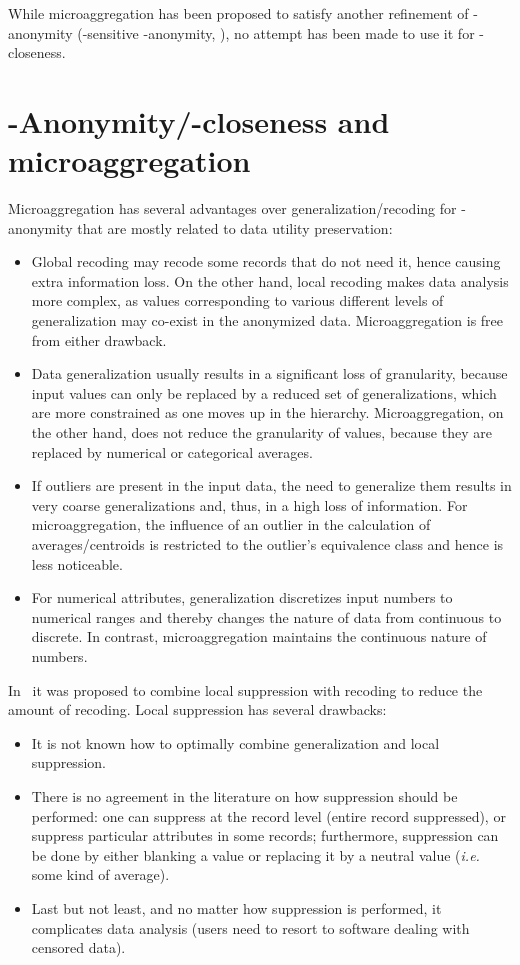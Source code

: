 \documentclass[10pt,journal,compsoc]{IEEEtran}
\theoremstyle{definition}
\theoremstyle{plain}
\begin{document}
While microaggregation has been proposed to satisfy
another refinement of -anonymity 
(-sensitive -anonymity, \cite{Solanas2008microaggregation}),
no attempt has been made to use it for -closeness.

\section{-Anonymity/-closeness and microaggregation}
\label{sec:comparison}





Microaggregation has several 
advantages over generalization/recoding for -anonymity that are 
mostly related to data utility preservation:
\begin{itemize}
\item Global recoding may recode some records that
do not need it, hence causing extra information loss.
On the other hand, local recoding makes data analysis more
complex, as values corresponding to various different
levels of generalization may co-exist in the anonymized data.
Microaggregation is free from either drawback.
\item Data generalization usually results in a significant 
loss of granularity, because input values can only be replaced 
by a reduced set of generalizations, which 
are more constrained as one moves up in the hierarchy. 
Microaggregation, on the other hand,
does not reduce the granularity of values, because they are 
replaced by numerical or categorical averages.
\item If outliers are present in the input data, 
the need to generalize them
results in very coarse generalizations and, thus, in a high loss of information.
For microaggregation, the influence of an outlier in the 
calculation of averages/centroids
is restricted to the outlier's equivalence class and hence is less noticeable.
\item For numerical attributes, generalization discretizes 
input numbers to numerical ranges and thereby changes 
the nature of data from continuous to discrete.
In contrast, microaggregation 
maintains the continuous nature of numbers.
\end{itemize} 

In~\cite{Samarati1998Protecting,Sweeney2002kAnonymity} it was proposed
to combine local suppression with recoding to reduce
the amount of recoding. Local
suppression has several drawbacks:
\begin{itemize}
\item It is not known how to optimally combine generalization and 
local suppression.
\item There is no agreement in the literature on how suppression
should be performed:
one can suppress at the record level (entire record suppressed),
or suppress particular attributes in some records; furthermore, 
suppression can be done by either blanking a value or replacing it 
by a neutral value ({\em i.e.} some kind of average).
\item Last but not least, and no matter how suppression is performed,
it complicates data analysis (users need to resort to software
dealing with censored data).
\end{itemize}  
\end{document}
